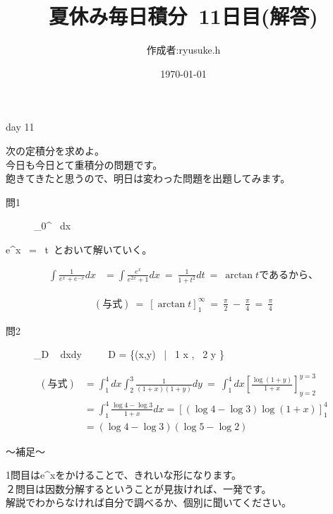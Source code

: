 \documentclass[12pt,a4paper,dvipdfmx]{jsarticle}
\title{夏休み毎日積分~11日目(解答)}
\date{\today}
\begin{document}
\maketitle

\begin{flushright}
    \author{作成者:ryusuke.h}
\end{flushright}

\begin{itembox}{day 11 }
    \begin{center}
        次の定積分を求めよ。\\
        今日も今日とて重積分の問題です。\\
        飽きてきたと思うので、明日は変わった問題を出題してみます。
    \end{center}
\end{itembox}

\begin{description}
    \item [問1] {\displaystyle} \int_0^\infty {} ~dx~ \\
\end{description}

e^x ~=~ t~とおいて解いていく。

\begin{align*}
    \int \frac{1}{e^x+e^{-x}} dx &= \int \frac{e^x}{e^{2x}+1}dx ~=~ \frac{1}{1+t^2}dt 
    ~=~ \arctan{t} であるから、
\end{align*}

\begin{align*}
    (与式) ~=~  \left[\arctan{t}\right]_1^{\infty} ~=~ \frac{\pi}{2} ~-~ \frac{\pi}{4} ~=~ \frac{\pi}{4}
\end{align*}

\begin{description}
    \item [問2] {\displaystyle} \iint_D  ~ dxdy ~~~~ D = \{(x,y) ~|~ 1 \leqq x ,~ 2 \leqq y \}
\end{description}

\begin{align*}
    (与式) &= \int_1^4 dx \int_2^3 \frac{1}{(1+x)(1+y)}dy ~=~ \int_1^4dx \left[\frac{\log(1+y)}{1+x}\right]_{y = 2}^{y = 3} \\
    &= \int_1^4 \frac{\log{4} - \log{3}}{1+x}dx = \left[\left( \log{4}-\log{3} \right)\log\left(1+x\right)\right]_1^4 \\
    &= \left(\log{4}-\log{3}\right)\left(\log{5}-\log{2}\right)
\end{align*}

\begin{boxnote}
    〜補足〜
    \begin{center}
        1問目はe^xをかけることで、きれいな形になります。\\
        ２問目は因数分解するということが見抜ければ、一発です。\\
        解説でわからなければ自分で調べるか、個別に聞いてください。
    \end{center}
\end{boxnote}
\end{document}
